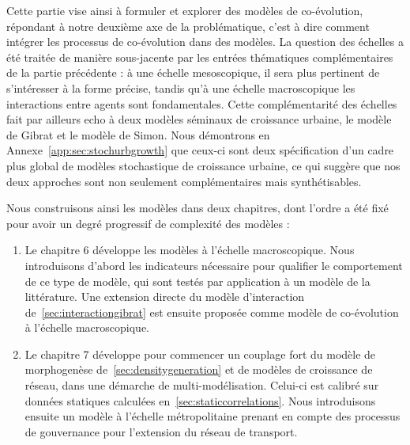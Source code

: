 Cette partie vise ainsi à formuler et explorer des modèles de co-évolution, répondant à notre deuxième axe de la problématique, c'est à dire comment intégrer les processus de co-évolution dans des modèles. La question des échelles a été traitée de manière sous-jacente par les entrées thématiques complémentaires de la partie précédente : à une échelle mesoscopique, il sera plus pertinent de s'intéresser à la forme précise, tandis qu'à une échelle macroscopique les interactions entre agents sont fondamentales. Cette complémentarité des échelles fait par ailleurs echo à deux modèles séminaux de croissance urbaine, le modèle de Gibrat et le modèle de Simon. Nous démontrons en Annexe~\ref{app:sec:stochurbgrowth} que ceux-ci sont deux spécification d'un cadre plus global de modèles stochastique de croissance urbaine, ce qui suggère que nos deux approches sont non seulement complémentaires mais synthétisables.


Nous construisons ainsi les modèles dans deux chapitres, dont l'ordre a été fixé pour avoir un degré progressif de complexité des modèles :
\begin{enumerate}
	\item Le chapitre 6 développe les modèles à l'échelle macroscopique. Nous introduisons d'abord les indicateurs nécessaire pour qualifier le comportement de ce type de modèle, qui sont testés par application à un modèle de la littérature. Une extension directe du modèle d'interaction de~\ref{sec:interactiongibrat} est ensuite proposée comme modèle de co-évolution à l'échelle macroscopique.
	\item Le chapitre 7 développe pour commencer un couplage fort du modèle de morphogenèse de~\ref{sec:densitygeneration} et de modèles de croissance de réseau, dans une démarche de multi-modélisation. Celui-ci est calibré sur données statiques calculées en~\ref{sec:staticcorrelations}. Nous introduisons ensuite un modèle à l'échelle métropolitaine prenant en compte des processus de gouvernance pour l'extension du réseau de transport.
\end{enumerate}


\stars





